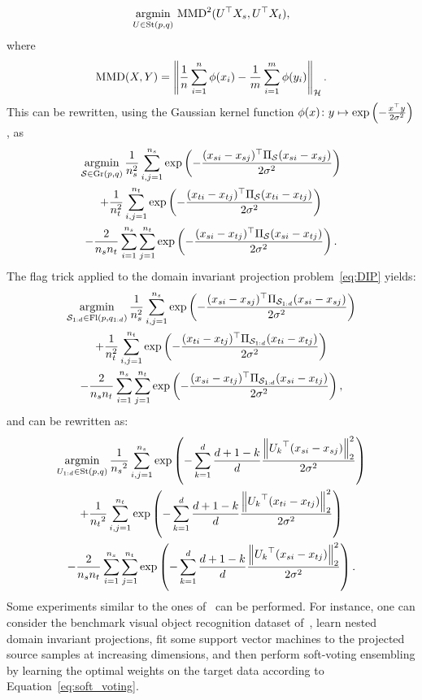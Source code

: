 \begin{equation}
	\underset{U \in \operatorname{St}(p, q)}{\operatorname{argmin}} \, \operatorname{MMD}^2(U^\top X_{s}, U^\top X_{t}),
\end{equation}
where 
\begin{equation}
	\operatorname{MMD} (X, Y) = \left\lVert\frac 1 n \sum_{i=1}^n \phi (x_i) - \frac 1 m \sum_{i=1}^m \phi (y_i)\right\rVert_\mathcal{H}.
\end{equation}
This can be rewritten, using the Gaussian kernel function $\phi(x)\colon y \mapsto \exp\left(-\frac{x^\top y}{2\sigma^2}\right)$, as
\begin{multline}\label{eq:DIP}
	\underset{\mathcal{S} \in \operatorname{Gr}(p, q)}{\operatorname{argmin}} \, 
	\frac 1 {n_s^2} \sum_{i,j=1}^{n_s} \exp\left(-\frac{(x_{si} - x_{sj})^\top \Pi_{\mathcal{S}} (x_{si} - x_{sj})}{2 \sigma^2}\right)\\
	+ \frac 1 {n_t^2} \sum_{i,j=1}^{n_t} \exp\left(-\frac{(x_{ti} - x_{tj})^\top \Pi_{\mathcal{S}} (x_{ti} - x_{tj})}{2 \sigma^2}\right)\\
	- \frac 2 {n_s n_t} \sum_{i=1}^{n_s} \sum_{j=1}^{n_t} \exp\left(-\frac{(x_{si} - x_{tj})^\top \Pi_{\mathcal{S}} (x_{si} - x_{tj})}{2 \sigma^2}\right).
\end{multline}
The flag trick applied to the domain invariant projection problem~\eqref{eq:DIP} yields:
\begin{multline}
	\underset{\mathcal{S}_{1:d} \in \operatorname{Fl}(p, q_{1:d})}{\operatorname{argmin}} \, 
	\frac 1 {n_s^2} \sum_{i,j=1}^{n_s} \exp\left(-\frac{(x_{si} - x_{sj})^\top \Pi_{\mathcal{S}_{1:d}} (x_{si} - x_{sj})}{2 \sigma^2}\right)\\
	+ \frac 1 {n_t^2} \sum_{i,j=1}^{n_t} \exp\left(-\frac{(x_{ti} - x_{tj})^\top \Pi_{\mathcal{S}_{1:d}} (x_{ti} - x_{tj})}{2 \sigma^2}\right)\\
	- \frac 2 {n_s n_t} \sum_{i=1}^{n_s} \sum_{j=1}^{n_t} \exp\left(-\frac{(x_{si} - x_{tj})^\top \Pi_{\mathcal{S}_{1:d}} (x_{si} - x_{tj})}{2 \sigma^2}\right),
\end{multline}
and can be rewritten as:
\begin{multline}
	\underset{U_{1:d} \in \operatorname{St}(p, q)}{\operatorname{argmin}} \,
	\frac 1 {{n_s}^2} \sum_{i,j=1}^{n_s} \exp\left(-\sum_{k=1}^d \frac{d+1-k}{d} \frac{\left\lVert{U_k}^\top (x_{si} - x_{sj})\right\rVert_2^2}{2 \sigma^2}\right)\\
	+ \frac 1 {{n_t}^2} \sum_{i,j=1}^{n_t} \exp\left(-\sum_{k=1}^d \frac{d+1-k}{d} \frac{\left\lVert{U_k}^\top (x_{ti} - x_{tj})\right\rVert_2^2}{2 \sigma^2}\right)\\
	- \frac 2 {{n_s} {n_t}} \sum_{i=1}^{n_s} \sum_{j=1}^{n_t} \exp\left(-\sum_{k=1}^d \frac{d+1-k}{d} \frac{\left\lVert{U_k}^\top (x_{si} - x_{tj})\right\rVert_2^2}{2 \sigma^2}\right).
\end{multline}
Some experiments similar to the ones of~\citet{baktashmotlagh_unsupervised_2013} can be performed. For instance, one can consider the benchmark visual object recognition dataset of~\citet{saenko_adapting_2010}, learn nested domain invariant projections, fit some support vector machines to the projected source samples at increasing dimensions, and then perform soft-voting ensembling by learning the optimal weights on the target data according to Equation~\eqref{eq:soft_voting}.

